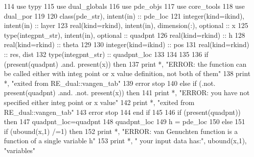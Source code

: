 \begin{DoxyCode}
114       \textcolor{keywordtype}{use }typy
115       \textcolor{keywordtype}{use }dual_globals
116       \textcolor{keywordtype}{use }pde_objs
117       \textcolor{keywordtype}{use }core_tools
118       \textcolor{keywordtype}{use }dual_por
119       
120       \textcolor{keywordtype}{class}(pde_str), \textcolor{keywordtype}{intent(in)} :: pde\_loc
121       \textcolor{keywordtype}{integer(kind=ikind)}, \textcolor{keywordtype}{intent(in)} :: layer
123       \textcolor{keywordtype}{real(kind=rkind)}, \textcolor{keywordtype}{intent(in)}, \textcolor{keywordtype}{dimension(:)}, \textcolor{keywordtype}{optional} :: x
125       \textcolor{keywordtype}{type}(integpnt_str), \textcolor{keywordtype}{intent(in)}, \textcolor{keywordtype}{optional} :: quadpnt
126       \textcolor{keywordtype}{real(kind=rkind)} :: h
128       \textcolor{keywordtype}{real(kind=rkind)} :: theta
129 
130       \textcolor{keywordtype}{integer(kind=ikind)} :: pos
131       \textcolor{keywordtype}{real(kind=rkind)} :: res, dist
132       \textcolor{keywordtype}{type}(integpnt_str) :: quadpnt\_loc
133 
134       
135       
136       \textcolor{keywordflow}{if} (\textcolor{keyword}{present}(quadpnt) .and. \textcolor{keyword}{present}(x)) \textcolor{keywordflow}{then}
137         print *, \textcolor{stringliteral}{"ERROR: the function can be called either with integ point or x value definition, not both
       of them"}
138         print *, \textcolor{stringliteral}{"exited from RE\_dual::vangen\_tab"}
139         error stop
140       \textcolor{keywordflow}{else} \textcolor{keywordflow}{if} (.not. \textcolor{keyword}{present}(quadpnt) .and. .not. \textcolor{keyword}{present}(x)) \textcolor{keywordflow}{then}
141         print *, \textcolor{stringliteral}{"ERROR: you have not specified either integ point or x value"}
142         print *, \textcolor{stringliteral}{"exited from RE\_dual::vangen\_tab"}
143         error stop
144 \textcolor{keywordflow}{      end if}
145       
146       \textcolor{keywordflow}{if} (\textcolor{keyword}{present}(quadpnt)) \textcolor{keywordflow}{then}
147         quadpnt\_loc=quadpnt
148         quadpnt\_loc%
149         h = pde\_loc%
150       \textcolor{keywordflow}{else}
151         \textcolor{keywordflow}{if} (ubound(x,1) /=1) \textcolor{keywordflow}{then}
152           print *, \textcolor{stringliteral}{"ERROR: van Genuchten function is a function of a single variable h"}
153           print *, \textcolor{stringliteral}{"       your input data has:"}, ubound(x,1), \textcolor{stringliteral}{"variables"}

\end{DoxyCode}
